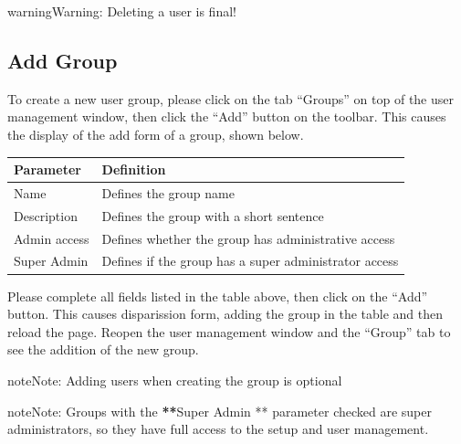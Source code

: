 \documentclass[letterpaper,10pt,english]{sphinxmanual}
\begin{document}
\begin{notice}{warning}{Warning:}
Deleting a user is final!
\end{notice}


\subsection{Add Group}
\label{dashboard/usersmanagement:ajouter-un-groupe}
To create a new user group, please click on the tab ``Groups'' on top of the user management window, then click the ``Add'' button on the toolbar. This causes the display of the add form of a group, shown below.


\begin{tabulary}{\linewidth}{|L|L|}
\hline

\textbf{Parameter}
 & 
\textbf{Definition}
\\
\hline
Name
 & 
Defines the group name
\\
\hline
Description
 & 
Defines the group with a short sentence
\\
\hline
Admin access
 & 
Defines whether the group has administrative access
\\
\hline
Super Admin
 & 
Defines if the group has a super administrator access
\\
\hline\end{tabulary}


Please complete all fields listed in the table above, then click on the ``Add'' button. This causes disparission form, adding the group in the table and then reload the page. Reopen the user management window and the ``Group'' tab to see the addition of the new group.

\begin{notice}{note}{Note:}
Adding users when creating the group is optional
\end{notice}

\begin{notice}{note}{Note:}
Groups with the  {\color{red}\bfseries{}**}Super Admin ** parameter checked are super administrators, so they have full access to the setup and user management.
\end{notice}
\end{document}
